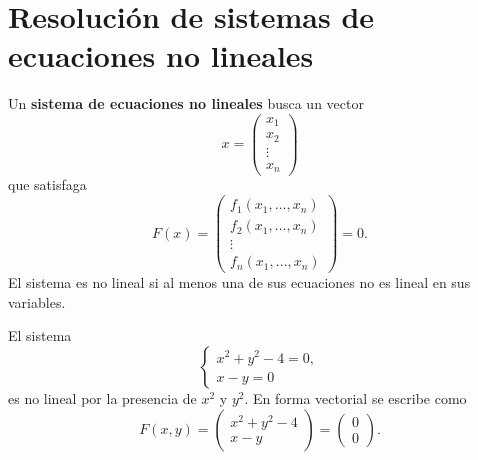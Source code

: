 \documentclass[a4,11pt]{aleph-notas}
\begin{document}
\encabezado

\section{Resolución de sistemas de ecuaciones no lineales}

\begin{defi}
    Un \textbf{sistema de ecuaciones no lineales} busca un vector
    \[
        x=
        \begin{pmatrix}
            x_1\\
            x_2\\
            \vdots\\
            x_n
        \end{pmatrix}
    \]
    que satisfaga
    \[
        F({x})=
        \begin{pmatrix}
            f_1(x_1,\ldots,x_n)\\
            f_2(x_1,\ldots,x_n)\\
            \vdots\\
            f_n(x_1,\ldots,x_n)
        \end{pmatrix}
        =
        {0}.
    \]
    El sistema es no lineal si al menos una de sus ecuaciones no es lineal en sus variables.
\end{defi}

\begin{ejem}
    El sistema
    \[
        \begin{cases}
            x^2+y^2-4=0,\\
            x-y=0
        \end{cases}
    \]
    es no lineal por la presencia de $x^2$ y $y^2$. En forma vectorial se escribe como
    \[
        F(x,y)=
        \begin{pmatrix}
            x^2+y^2-4\\
            x-y
        \end{pmatrix}=
        \begin{pmatrix}
            0\\
            0
        \end{pmatrix}.
    \]
\end{ejem}
\end{document}
